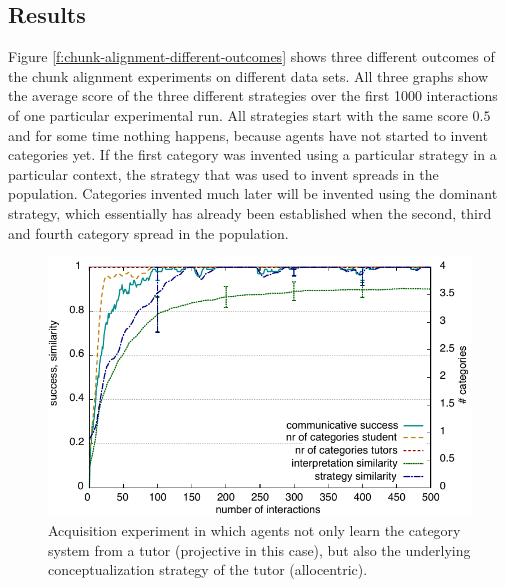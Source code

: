 \subsection{Results}
Figure \ref{f:chunk-alignment-different-outcomes} shows three different outcomes 
of the chunk alignment experiments on different data sets. All three graphs show
the average score of the three different strategies over the first 1000 interactions 
of one particular experimental run. All strategies start with 
the same score $0.5$ and for some time nothing happens, because agents 
have not started to invent categories yet. If the first category was invented 
using a particular strategy in a particular context, the strategy that was used 
to invent spreads in the population. Categories invented much later will be 
invented using the dominant strategy, which essentially 
has already been established when the second, third and fourth category 
spread in the population.


\begin{figure}
\begin{centering}
\includegraphics[width=0.9\columnwidth]{figs/chunk-alignment-chunks-acquisition}
\caption[Results strategy acquisition experiments]{
Acquisition experiment in which agents not only learn the 
category system from a tutor (projective in this case), but also 
the underlying conceptualization strategy of the tutor (allocentric).}
\label{f:chunk-alignment-acquisition}
\end{centering}
\end{figure}

